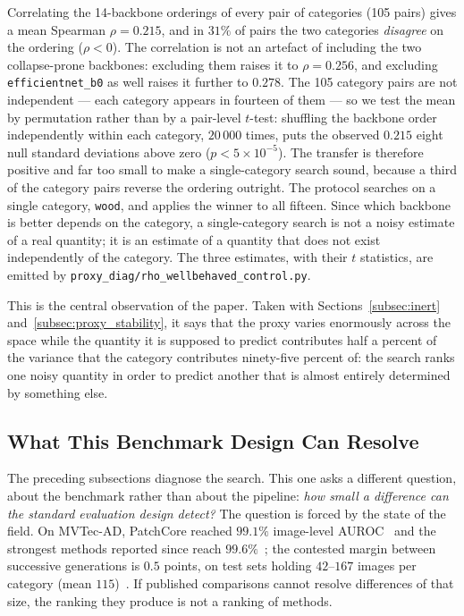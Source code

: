 Correlating the 14-backbone orderings of every pair of categories (105 pairs)
gives a mean Spearman $\rho = 0.215$, and in $31\%$ of pairs the two categories
\emph{disagree} on the ordering ($\rho < 0$). The correlation is not an artefact
of including the two collapse-prone backbones: excluding them raises it to
$\rho = 0.256$, and excluding \texttt{efficientnet\_b0} as well raises it further
to $0.278$. The 105 category pairs are not independent --- each category appears
in fourteen of them --- so we test the mean by permutation rather than by a
pair-level $t$-test: shuffling the backbone order independently within each
category, $20\,000$ times, puts the observed $0.215$ eight null standard
deviations above zero ($p < 5\times10^{-5}$). The transfer is therefore positive
and far too small to make a single-category search sound, because a third of the
category pairs reverse the ordering outright. The protocol searches on a single
category, \texttt{wood}, and applies the winner to all fifteen. Since which
backbone is better depends on the category, a single-category search is not a
noisy estimate of a real quantity; it is an estimate of a quantity that does not
exist independently of the category. The three estimates, with their $t$
statistics, are emitted by \texttt{proxy\_diag/rho\_wellbehaved\_control.py}.

This is the central observation of the paper. Taken with
Sections~\ref{subsec:inert} and~\ref{subsec:proxy_stability}, it says that the
proxy varies enormously across the space while the quantity it is supposed to
predict contributes half a percent of the variance that the category contributes
ninety-five percent of: the search ranks one noisy quantity in order to predict
another that is almost entirely determined by something else.

\subsection{What This Benchmark Design Can Resolve}
\label{subsec:resolvability}

The preceding subsections diagnose the search. This one asks a different
question, about the benchmark rather than about the pipeline: \emph{how small a
difference can the standard evaluation design detect?} The question is forced by
the state of the field. On MVTec-AD, PatchCore reached $99.1\%$ image-level
AUROC~\cite{roth2022patchcore} and the strongest methods reported since reach
$99.6\%$~\cite{liu2023simplenet,guo2025dinomaly}; the contested margin between
successive generations is $0.5$ points, on test sets holding $42$--$167$ images
per category (mean $115$)~\cite{bergmann2021mvtec}. If published comparisons
cannot resolve differences of that
size, the ranking they produce is not a ranking of methods.


